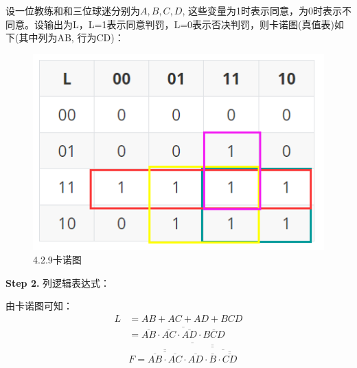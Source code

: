 \documentclass[a4paper,11pt,UTF8]{article}
\begin{document}
设一位教练和和三位球迷分别为$A,B,C,D$, 这些变量为1时表示同意，为0时表示不同意。设输出为L，L=1表示同意判罚，L=0表示否决判罚，则卡诺图(真值表)如下(其中列为AB, 行为CD)：
\begin{figure}[H]
	\centering
	\includegraphics[scale=0.29]{SD4.2.9_1}
	\caption{4.2.9卡诺图}
\end{figure}
\textbf{Step 2.} 列逻辑表达式：

由卡诺图可知：
$$\begin{aligned}
	L&=AB+AC+AD+BCD\\
	&=\overline{\overline{AB}\cdot\overline{AC}\cdot\overline{AD}\cdot\overline{BCD}}\\
	&F=\overline{\overline{\overline{\overline{AB}\cdot\overline{AC}}}\cdot\overline{\overline{\overline{AD}\cdot\overline{\overline{B}\cdot\overline{\overline{CD}}}}}}
\end{aligned}
$$
\end{document}
